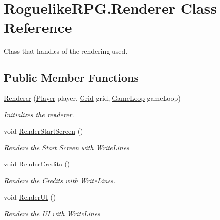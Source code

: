\hypertarget{class_roguelike_r_p_g_1_1_renderer}{}\section{Roguelike\+R\+P\+G.\+Renderer Class Reference}
\label{class_roguelike_r_p_g_1_1_renderer}


Class that handles of the rendering used.  


\subsection*{Public Member Functions}
\begin{DoxyCompactItemize}
\item 
\mbox{\hyperlink{class_roguelike_r_p_g_1_1_renderer_a398c2192581cc61abc4ad6a0299cab96}{Renderer}} (\mbox{\hyperlink{class_roguelike_r_p_g_1_1_player}{Player}} player, \mbox{\hyperlink{class_roguelike_r_p_g_1_1_grid}{Grid}} grid, \mbox{\hyperlink{class_roguelike_r_p_g_1_1_game_loop}{Game\+Loop}} game\+Loop)
\begin{DoxyCompactList}\small\item\em Initializes the renderer. \end{DoxyCompactList}\item 
void \mbox{\hyperlink{class_roguelike_r_p_g_1_1_renderer_a271d86335afd2b6ef8c2ca673baecb21}{Render\+Start\+Screen}} ()
\begin{DoxyCompactList}\small\item\em Renders the Start Screen with Write\+Line\textquotesingle{}s \end{DoxyCompactList}\item 
void \mbox{\hyperlink{class_roguelike_r_p_g_1_1_renderer_a6d07f00e8ed8c9d2897a24630a0a353c}{Render\+Credits}} ()
\begin{DoxyCompactList}\small\item\em Renders the Credits with Write\+Line\textquotesingle{}s. \end{DoxyCompactList}\item 
void \mbox{\hyperlink{class_roguelike_r_p_g_1_1_renderer_a74f7f40cef19e77afac474d526df9e43}{Render\+UI}} ()
\begin{DoxyCompactList}\small\item\em Renders the UI with Write\+Line\textquotesingle{}s \end{DoxyCompactList}\end{DoxyCompactItemize}


